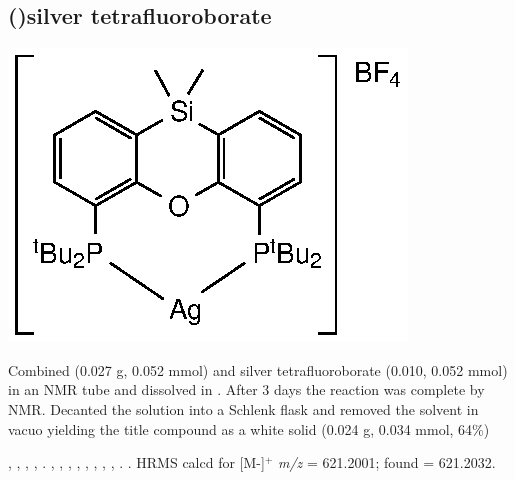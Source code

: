 

\subsection*{(\tBuSixantphos)silver tetrafluoroborate}
\begin{structure}[h]
\begin{center}
\includegraphics{../Structures/SitBuSilverBF4.eps}
\end{center}
\end{structure}

Combined \tBusixantphos{} (0.027 g, 0.052 mmol) and silver tetrafluoroborate (0.010, 0.052 mmol) in an NMR tube and dissolved in .  After 3 days the reaction was complete by NMR.  Decanted the solution into a Schlenk flask and removed the solvent in vacuo yielding the title compound as a white solid (0.024 g, 0.034 mmol, 64\%)

,
,
,
,
.
,
,
,
,
,
,
, %
,
.
.
HRMS calcd for  [M-]$^+$ \emph{m/z} = 621.2001; found = 621.2032.

